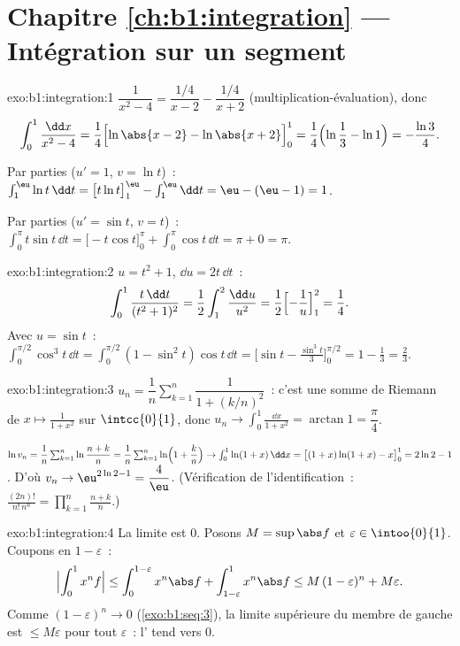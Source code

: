 \section*{Chapitre \ref{ch:b1:integration} --- Intégration sur un segment}

\begin{solution}{exo:b1:integration:1}
$\dfrac{1}{x^2-4} = \dfrac{1/4}{x - 2} - \dfrac{1/4}{x+2}$
(multiplication-évaluation), donc
\[
\int_0^1 \frac{\dd x}{x^2 - 4}
= \frac14\Bigl[\ln\abs{x-2} - \ln\abs{x+2}\Bigr]_0^1
= \frac14\Bigl(\ln\frac{1}{3} - \ln 1\Bigr) = -\frac{\ln 3}{4}.
\]

Par parties ($u' = 1$, $v = \ln t$)~: $\int_1^{\eu} \ln t\,\dd t =
\bigl[t\ln t\bigr]_1^{\eu} - \int_1^{\eu} \dd t = \eu - (\eu - 1) =
1$.

Par parties ($u' = \sin t$, $v = t$)~: $\int_0^\pi t\sin t\,\dd t =
\bigl[-t\cos t\bigr]_0^\pi + \int_0^\pi \cos t\,\dd t = \pi + 0 =
\pi$.
\end{solution}

\begin{solution}{exo:b1:integration:2}
 $u = t^2 + 1$, $\dd u = 2t\,\dd t$~:
\[
\int_0^1 \frac{t\,\dd t}{(t^2+1)^2}
= \frac12 \int_1^2 \frac{\dd u}{u^2}
= \frac12\Bigl[-\frac1u\Bigr]_1^2 = \frac14 .
\]
Avec $u = \sin t$~: $\int_0^{\pi/2} \cos^3 t\,\dd t = \int_0^{\pi/2}
(1 - \sin^2 t)\cos t\,\dd t = \bigl[\sin t - \frac{\sin^3
t}{3}\bigr]_0^{\pi/2} = 1 - \frac13 = \frac23$.
\end{solution}

\begin{solution}{exo:b1:integration:3}
$u_n = \dfrac1n \sum_{k=1}^{n} \dfrac{1}{1 + (k/n)^2}$~: c'est une
somme de Riemann de $x \mapsto \frac{1}{1+x^2}$ sur $\intcc{0}{1}$,
donc $u_n \to \int_0^1 \frac{\dd x}{1+x^2} = \arctan 1 =
\dfrac\pi4$.

$\ln v_n = \dfrac1n \sum_{k=1}^{n} \ln\dfrac{n+k}{n} = \dfrac 1n
\sum_{k=1}^n \ln\Bigl(1 + \dfrac kn\Bigr) \to \int_0^1 \ln(1+x)\,\dd
x = \bigl[(1+x)\ln(1+x) - x\bigr]_0^1 = 2\ln 2 - 1$. D'où $v_n \to
\eu^{2\ln 2 - 1} = \dfrac 4\eu$. (Vérification de l'identification~:
$\frac{(2n)!}{n!\,n^n} = \prod_{k=1}^{n} \frac{n+k}{n}$.)
\end{solution}

\begin{solution}{exo:b1:integration:4}
La limite est $0$. Posons $M = \sup \abs f$ et $\varepsilon \in
\intoo{0}{1}$. Coupons en $1 - \varepsilon$~:
\[
\Bigl| \int_0^1 x^n f \Bigr|
\leq \int_0^{1 - \varepsilon} x^n \abs f + \int_{1-\varepsilon}^1
x^n \abs f
\leq M\,(1-\varepsilon)^n + M\varepsilon .
\]
Comme $(1 - \varepsilon)^n \to 0$ (\cref{exo:b1:seq:3}), la limite
supérieure du membre de gauche est $\leq M\varepsilon$ pour tout
$\varepsilon$~: l' tend vers $0$.
\end{solution}

